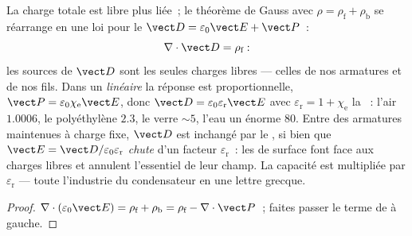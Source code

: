 \begin{proposition}\label{prop:b3:electromagnetism-in-matter:displacement}
La charge totale est libre plus liée~; le théorème de Gauss avec $\rho =
\rho_{\text{f}} + \rho_{\text{b}}$ se réarrange en une loi pour le
\emph{} $\vect D = \varepsilon_0\vect E +
\vect P$~:
\[
\nabla\cdot\vect D = \rho_{\text{f}} :
\]
les sources de $\vect D$ sont les seules charges libres --- celles de
nos armatures et de nos fils. Dans un  \emph{linéaire} la
réponse est proportionnelle,
$\vect P = \varepsilon_0\chi_{\text{e}}\vect E$, donc
$\vect D = \varepsilon_0\varepsilon_{\text{r}}\vect E$ avec
$\varepsilon_{\text{r}} = 1 + \chi_{\text{e}}$ la \emph{}~: l'air $1.0006$, le polyéthylène $2.3$, le verre
$\sim 5$, l'eau un énorme $80$. Entre des armatures maintenues à
charge fixe, $\vect D$ est inchangé par le , si bien que $\vect E =
\vect D/\varepsilon_0\varepsilon_{\text{r}}$ \emph{chute} d'un facteur
$\varepsilon_{\text{r}}$~: les  de surface font face aux
charges libres et annulent l'essentiel de leur champ. La capacité est
multipliée par $\varepsilon_{\text{r}}$ --- toute l'industrie du
condensateur en une lettre grecque.
\end{proposition}

\begin{proof}
$\nabla\cdot(\varepsilon_0\vect E) = \rho_{\text{f}} +
\rho_{\text{b}} = \rho_{\text{f}} - \nabla\cdot\vect P$~; faites
passer le terme de  à gauche.
\end{proof}

